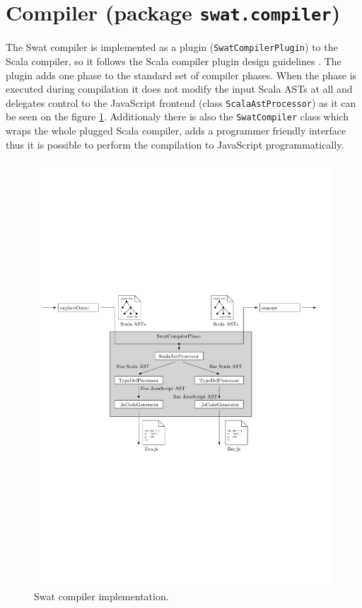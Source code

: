 \documentclass[12pt,a4paper]{report}
\begin{document}
\section{Compiler (package \texttt{swat.compiler})}

The Swat compiler is implemented as a plugin (\texttt{SwatCompilerPlugin}) to the Scala compiler, so it follows the Scala compiler plugin design guidelines \cite{CompilerPlugins}. The plugin adds one phase to the standard set of compiler phases. When the phase is executed during compilation it does not modify the input Scala ASTs at all and delegates control to the JavaScript frontend (class \texttt{ScalaAstProcessor}) as it can be seen on the figure \ref{SwatCompiler}. Additionaly there is also the \texttt{SwatCompiler} class which wraps the whole plugged Scala compiler, adds a programmer friendly interface thus it is possible to perform the compilation to JavaScript programmatically.

\begin{figure}[ht]
  \centering
	\includegraphics[width=\linewidth,height=\textheight,keepaspectratio]{img/SwatCompiler.pdf}
	\caption{Swat compiler implementation.}
	\label{SwatCompiler}
\end{figure}
\end{document}

